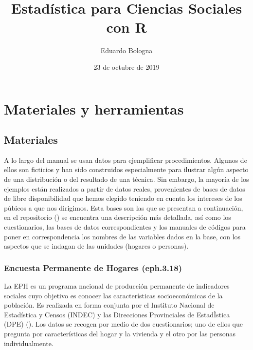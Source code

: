 \documentclass[]{book}
\title{Estadística para Ciencias Sociales con R}
\author{Eduardo Bologna}
\date{23 de octubre de 2019}
\begin{document}
\maketitle

{
\hypersetup{linkcolor=black}
\setcounter{tocdepth}{1}
\tableofcontents
}
\listoftables
\listoffigures
\hypertarget{section}{%
\chapter*{}\label{section}}

\hypertarget{materiales-y-herramientas}{%
\chapter{Materiales y herramientas}\label{materiales-y-herramientas}}

\hypertarget{materiales}{%
\section{Materiales}\label{materiales}}

A lo largo del manual se usan datos para ejemplificar procedimientos. Algunos de ellos son ficticios y han sido construidos especialmente para ilustrar algún aspecto de una distribución o del resultado de una técnica. Sin embargo, la mayoría de los ejemplos están realizados a partir de datos reales, provenientes de bases de datos de libre disponibilidad que hemos elegido teniendo en cuenta los intereses de los púbicos a que nos dirigimos. Esta bases son las que se presentan a continuación, en el repositorio () se encuentra una descripción más detallada, así como los cuestionarios, las bases de datos correspondientes y los manuales de códigos para poner en correspondencia los nombres de las variables dados en la base, con los aspectos que se indagan de las unidades (hogares o personas).

\hypertarget{encuesta-permanente-de-hogares-eph.3.18}{%
\subsection{Encuesta Permanente de Hogares (eph.3.18)}\label{encuesta-permanente-de-hogares-eph.3.18}}

La EPH es un programa nacional de producción permanente de indicadores sociales cuyo objetivo es conocer las características socioeconómicas de la población. Es realizada en forma conjunta por el Instituto Nacional de Estadística y Censos (INDEC) y las Direcciones Provinciales de EstadÌstica (DPE) (\citet{INDEC2003}). Los datos se recogen por medio de dos cuestionarios; uno de ellos que pregunta por características del hogar y la vivienda y el otro por las personas individualmente.
\end{document}
